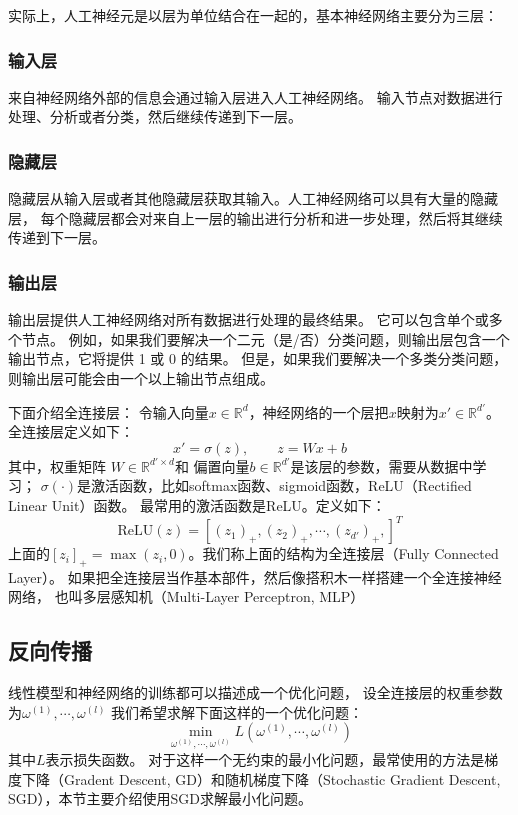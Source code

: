 \documentclass[AutoFakeBold]{LZUThesis}
\begin{document}
实际上，人工神经元是以层为单位结合在一起的，基本神经网络主要分为三层：

\subsubsection{输入层}
来自神经网络外部的信息会通过输入层进入人工神经网络。
输入节点对数据进行处理、分析或者分类，然后继续传递到下一层。

\subsubsection{隐藏层}
隐藏层从输入层或者其他隐藏层获取其输入。人工神经网络可以具有大量的隐藏层，
每个隐藏层都会对来自上一层的输出进行分析和进一步处理，然后将其继续传递到下一层。

\subsubsection{输出层}
输出层提供人工神经网络对所有数据进行处理的最终结果。
它可以包含单个或多个节点。
例如，如果我们要解决一个二元（是/否）分类问题，则输出层包含一个输出节点，它将提供 1 或 0 的结果。
但是，如果我们要解决一个多类分类问题，则输出层可能会由一个以上输出节点组成。

下面介绍全连接层：
令输入向量$x \in \mathbb{R}^d$，神经网络的一个层把$x$映射为$x' \in \mathbb{R}^{d'}$。全连接层定义如下：
\begin{equation}
  x' = \sigma(z), \qquad z = W x + b
\end{equation}
其中，权重矩阵 $W \in \mathbb{R}^{d' \times d}$和
偏置向量$b \in \mathbb{R}^{d'}$是该层的参数，需要从数据中学习；
$\sigma(\cdot)$是激活函数，比如softmax函数、sigmoid函数，ReLU（Rectified Linear Unit）函数。
最常用的激活函数是ReLU。定义如下：
\begin{equation}
  \mathrm{ReLU}(z) = [(z_1)_+, (z_2)_+, \cdots, (z_{d'})_+,]^T
\end{equation}
上面的$[z_i]_+ = \max(z_i, 0)$。我们称上面的结构为全连接层（Fully Connected Layer）。
如果把全连接层当作基本部件，然后像搭积木一样搭建一个全连接神经网络，
也叫多层感知机（Multi-Layer Perceptron, MLP）

\subsection{反向传播}
线性模型和神经网络的训练都可以描述成一个优化问题，
设全连接层的权重参数为$\omega^{(1)}, \cdots, \omega^{(l)}$
我们希望求解下面这样的一个优化问题：
\begin{equation}
  \min_{\omega^{(1)}, \cdots, \omega^{(l)}} L(\omega^{(1)}, \cdots, \omega^{(l)})
\end{equation}
其中$L$表示损失函数。
对于这样一个无约束的最小化问题，最常使用的方法是梯度下降（Gradent Descent, GD）和随机梯度下降（Stochastic Gradient Descent, SGD），本节主要介绍使用SGD求解最小化问题。
\end{document}
